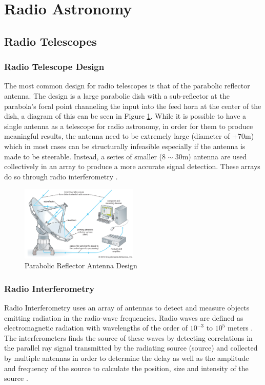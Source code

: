 \section{Radio Astronomy}\label{ra}
\subsection{Radio Telescopes}\label{ra:sec:rt}
%
\subsubsection{Radio Telescope Design}
The most common design for radio telescopes is that of the parabolic reflector antenna. The design is a large parabolic dish with a sub-reflector at the parabola's focal point channeling the input into the feed horn at the center of the dish, a diagram of this can be seen in Figure \ref{ra:fig:para}. While it is possible to have a single antenna as a telescope for radio astronomy, in order for them to produce meaningful results, the antenna need to be extremely large (diameter of $+70$m) which in most cases can be structurally infeasible especially if the antenna is made to be steerable. Instead, a series of smaller ($8\sim30$m) antenna are used collectively in an array to produce a more accurate signal detection. These arrays do so through radio interferometry \citep{cheng2009radio}.
%
\begin{figure}[H]
	\centering
	\includegraphics[width=0.5\textwidth]{Images/Telescope.jpg}
	\caption[]{Parabolic Reflector Antenna Design \footnotemark }
	\label{ra:fig:para}
\end{figure}
%
\subsubsection{Radio Interferometry}\label{ra:ssec:des}
Radio Interferometry uses an array of antennas to detect and measure objects emitting radiation in the radio-wave frequencies. Radio waves are defined as electromagnetic radiation with wavelengths of the order of $10^{-3}$ to $10^5$ meters \citep{cheng2009radio}. The interferometers finds the source of these waves by detecting correlations in the parallel ray signal transmitted by the radiating source (source) and collected by multiple antennas in order to determine the delay as well as the amplitude and frequency of the source to calculate the position, size and intensity of the source \citep{thompson2008interferometry}.
%
